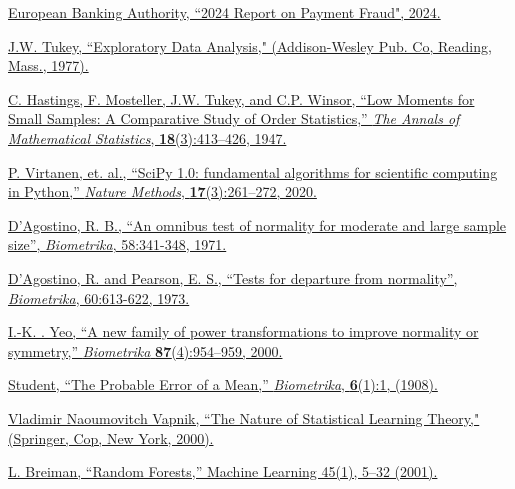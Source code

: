 \documentclass[11pt, oneside]{article}   	%
\begin{document}
\begin{enumerate}[label={[{\arabic*}]}]
   \item \href{https://www.eba.europa.eu/sites/default/files/2024-08/465e3044-4773-4e9d-8ca8-b1cd031295fc/EBA_ECB\%202024\%20Report\%20on\%20Payment\%20Fraud.pdf}{European Banking Authority, ``2024 Report on Payment Fraud", 2024.}
   
   \item \href{https://books.google.com/books/about/Exploratory_Data_Analysis.html?id=UT9dAAAAIAAJ}{J.W. Tukey, ``Exploratory Data Analysis," (Addison-Wesley Pub. Co, Reading, Mass., 1977).}
   
   \item \href{https://doi.org/10.1214/aoms/1177730388}{C. Hastings, F. Mosteller, J.W. Tukey, and C.P. Winsor, ``Low Moments for Small Samples: A Comparative Study of Order Statistics,” \textit{The Annals of Mathematical Statistics}, \textbf{18}(3):413–426, 1947.}
   
   \item \href{https://www.nature.com/articles/s41592-019-0686-2}{P. Virtanen, et. al., “SciPy 1.0: fundamental algorithms for scientific computing in Python,” \textit{Nature Methods}, \textbf{17}(3):261–272, 2020.}
   
   \item \href{https://doi.org/10.2307/2334522}{D’Agostino, R. B., ``An omnibus test of normality for moderate and large sample size”, \textit{Biometrika}, 58:341-348, 1971.}
   
   \item \href{https://doi.org/10.2307/2335012}{D’Agostino, R. and Pearson, E. S., ``Tests for departure from normality”, \textit{Biometrika}, 60:613-622, 1973.}
   
   \item \href{https://doi.org/10.1093/biomet/87.4.954}{I.-K. . Yeo, “A new family of power transformations to improve normality or symmetry,” \textit{Biometrika} \textbf{87}(4):954–959, 2000.}
   
   \item \href{https://doi.org/10.2307/2331554}{Student, “The Probable Error of a Mean,” \textit{Biometrika}, \textbf{6}(1):1, (1908).}
   
   \item \href{https://link.springer.com/book/10.1007/978-1-4757-3264-1}{Vladimir Naoumovitch Vapnik, ``The Nature of Statistical Learning Theory," (Springer, Cop, New York, 2000).}
   
   \item \href{https://doi.org/10.1023/A:1010933404324}{L. Breiman, ``Random Forests,” Machine Learning 45(1), 5–32 (2001).}
   

\end{enumerate}
\end{document}
